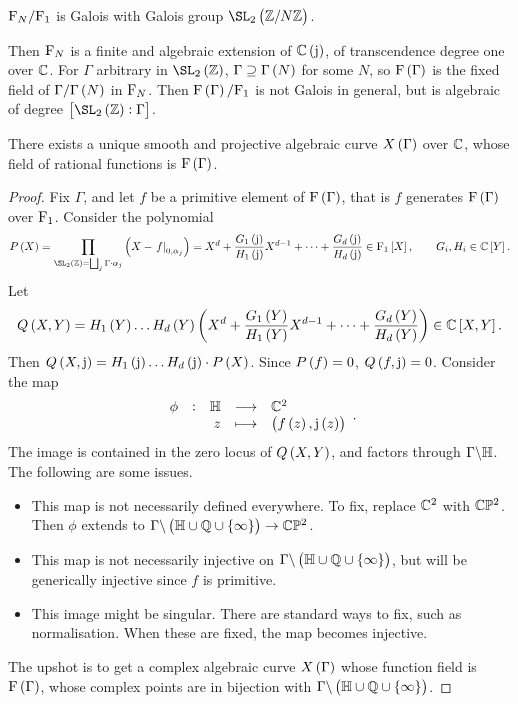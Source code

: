 \begin{corollary}
$ \mathrm{F}_N / \mathrm{F}_1 $ is Galois with Galois group $ \SL_2\br{\ZZ / N\ZZ} $.
\end{corollary}

Then $ \mathrm{F}_N $ is a finite and algebraic extension of $ \CC\br{\j} $, of transcendence degree one over $ \mathbb{C} $. For $ \Gamma $ arbitrary in $ \SL_2\br{\ZZ} $, $ \Gamma \supseteq \Gamma\br{N} $ for some $ N $, so $ \F\br{\Gamma} $ is the fixed field of $ \Gamma / \Gamma\br{N} $ in $ \mathrm{F}_N $. Then $ \F\br{\Gamma} / \F_1 $ is not Galois in general, but is algebraic of degree $ \sbr{\SL_2\br{\ZZ} : \Gamma} $.

\begin{proposition}
There exists a unique smooth and projective algebraic curve $ X\br{\Gamma} $ over $ \mathbb{C} $, whose field of rational functions is $ \F\br{\Gamma} $.
\end{proposition}

\begin{proof}
Fix $ \Gamma $, and let $ f $ be a primitive element of $ \F\br{\Gamma} $, that is $ f $ generates $ \F\br{\Gamma} $ over $ \mathrm{F}_1 $. Consider the polynomial
$$ P\br{X} = \prod_{\SL_2\br{\ZZ} = \bigsqcup_j \Gamma \cdot \alpha_j} \br{X - \eval{f}_{0, \alpha_j}} = X^d + \dfrac{G_1\br{\j}}{H_1\br{\j}}X^{d - 1} + \dots + \dfrac{G_d\br{\j}}{H_d\br{\j}} \in \F_1\sbr{X}, \qquad G_i, H_i \in \CC\sbr{Y}. $$
Let
$$ Q\br{X, Y} = H_1\br{Y} \dots H_d\br{Y}\br{X^d + \dfrac{G_1\br{Y}}{H_1\br{Y}}X^{d - 1} + \dots + \dfrac{G_d\br{Y}}{H_d\br{Y}}} \in \CC\sbr{X, Y}. $$
Then $ Q\br{X, \j} = H_1\br{\j} \dots H_d\br{\j} \cdot P\br{X} $. Since $ P\br{f} = 0 $, $ Q\br{f, \j} = 0 $. Consider the map
$$ \function[\phi]{\HH}{\CC^2}{z}{\br{f\br{z}, \j\br{z}}}. $$
The image is contained in the zero locus of $ Q\br{X, Y} $, and factors through $ \Gamma \backslash \mathbb{H} $. The following are some issues.
\begin{itemize}
\item This map is not necessarily defined everywhere. To fix, replace $ \mathbb{C}^2 $ with $ \mathbb{C}\mathbb{P}^2 $. Then $ \phi $ extends to $ \Gamma \backslash \br{\HH \cup \QQ \cup \cbr{\infty}} \to \CC\PP^2 $.
\item This map is not necessarily injective on $ \Gamma \backslash \br{\HH \cup \QQ \cup \cbr{\infty}} $, but will be generically injective since $ f $ is primitive.
\item This image might be singular. There are standard ways to fix, such as normalisation. When these are fixed, the map becomes injective.
\end{itemize}
The upshot is to get a complex algebraic curve $ X\br{\Gamma} $ whose function field is $ \F\br{\Gamma} $, whose complex points are in bijection with $ \Gamma \backslash \br{\HH \cup \QQ \cup \cbr{\infty}} $.
\end{proof}

